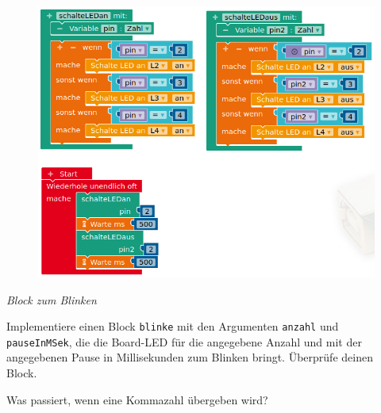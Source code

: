 \begin{figure}[H]
	\centering
	\includegraphics[width=\linewidth]{./pics/eigene-funktion-demo.png}
\end{figure}

\newpage
\begin{aufgabe} \emph{Block zum Blinken}
	
	Implementiere einen Block \texttt{blinke} mit den Argumenten \texttt{anzahl} und \texttt{pauseInMSek}, die die Board-LED für die angegebene Anzahl und mit der angegebenen Pause in Millisekunden zum Blinken bringt. Überprüfe deinen Block.
	
	Was passiert, wenn eine Kommazahl übergeben wird?
\end{aufgabe}


